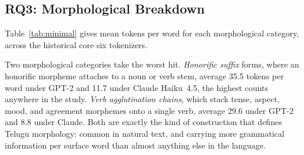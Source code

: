 ﻿\documentclass[11pt]{article}
\begin{document}
\subsection{RQ3: Morphological Breakdown}
\label{sec:results-minimal}

Table~\ref{tab:minimal} gives mean tokens per word for each
morphological category, across the historical core six tokenizers.
\begin{table}[H]
\centering
{}
\caption{Mean tokens/word by morphological type.
         G4o=GPT-4o, Cla.=Claude Haiku~4.5, G2=GPT-2,
         S-2B=Sarvam-2B, S-105B=Sarvam-105B,
         Anon.=Anon-Indic-GPT2 \citep{anonymous-2026-indic}.
         Bold = lowest per row.}
\label{tab:minimal}
\end{table}
Two morphological categories take the worst hit. \textit{Honorific
suffix} forms, where an honorific morpheme attaches to a noun or
verb stem, average 35.5 tokens per word under GPT-2 and 11.7 under
Claude Haiku~4.5, the highest counts anywhere in the study.
\textit{Verb agglutination chains}, which stack tense, aspect, mood,
and agreement morphemes onto a single verb, average 29.6 under GPT-2
and 8.8 under Claude. Both are exactly the kind of construction that
defines Telugu morphology: common in natural text, and carrying more
grammatical information per surface word than almost anything else
in the language.
\end{document}

